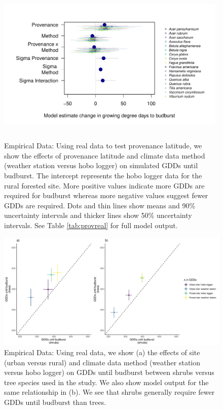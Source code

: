 \documentclass{article}\usepackage[]{graphicx}\usepackage[]{color}
\begin{document}
  
\begin{figure}[H]
      \centering
      \includegraphics[height=7cm, width=11cm]{..//analyses/figures/muplot_prov_real.pdf}
      \label{fig:muplotprov}
\caption{ Empirical Data: Using real data to test provenance latitude, we show the effects of provenance latitude and climate data method (weather station versus hobo logger) on simulated GDDs until budburst. The intercept represents the hobo logger data for the rural forested site. More positive values indicate more GDDs are required for budburst whereas more negative values suggest fewer GDDs are required. Dots and thin lines show means and 90\% uncertainty intervals and thicker lines show 50\% uncertainty intervals. See Table \ref{tab:provreal} for full model output.}
\label{fig:prov}
\end{figure}

\begin{figure}[H]
    \centering
    \includegraphics[width=12cm]{..//analyses/figures/functype.pdf}
\caption{ Empirical Data: Using real data, we show (a) the effects of site (urban versus rural) and climate data method (weather station versus hobo logger) on GDDs until budburst between shrubs versus tree species used in the study. We also show model output for the same relationship in (b). We see that shrubs generally require fewer GDDs until budburst than trees. }
\label{fig:funcs}
\end{figure}
\end{document}
